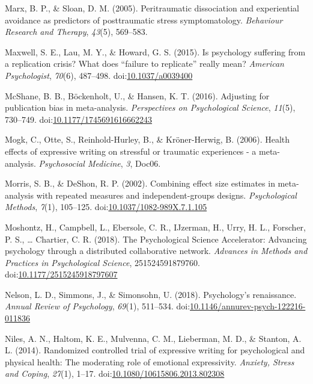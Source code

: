 \documentclass[man, mask]{apa6}
\theoremstyle{definition}
\theoremstyle{definition}
\theoremstyle{definition}
\theoremstyle{remark}
\begin{document}
\hypertarget{ref-Marx2005}{}
Marx, B. P., \& Sloan, D. M. (2005). Peritraumatic dissociation and
experiential avoidance as predictors of posttraumatic stress
symptomatology. \emph{Behaviour Research and Therapy}, \emph{43}(5),
569--583.

\hypertarget{ref-Maxwell2015}{}
Maxwell, S. E., Lau, M. Y., \& Howard, G. S. (2015). Is psychology
suffering from a replication crisis? What does ``failure to replicate''
really mean? \emph{American Psychologist}, \emph{70}(6), 487--498.
doi:\href{https://doi.org/10.1037/a0039400}{10.1037/a0039400}

\hypertarget{ref-McShane2016}{}
McShane, B. B., Böckenholt, U., \& Hansen, K. T. (2016). Adjusting for
publication bias in meta-analysis. \emph{Perspectives on Psychological
Science}, \emph{11}(5), 730--749.
doi:\href{https://doi.org/10.1177/1745691616662243}{10.1177/1745691616662243}

\hypertarget{ref-Mogk2006}{}
Mogk, C., Otte, S., Reinhold-Hurley, B., \& Kröner-Herwig, B. (2006).
Health effects of expressive writing on stressful or traumatic
experiences - a meta-analysis. \emph{Psychosocial Medicine}, \emph{3},
Doc06.

\hypertarget{ref-Morris2002}{}
Morris, S. B., \& DeShon, R. P. (2002). Combining effect size estimates
in meta-analysis with repeated measures and independent-groups designs.
\emph{Psychological Methods}, \emph{7}(1), 105--125.
doi:\href{https://doi.org/10.1037/1082-989X.7.1.105}{10.1037/1082-989X.7.1.105}

\hypertarget{ref-Moshontz2018}{}
Moshontz, H., Campbell, L., Ebersole, C. R., IJzerman, H., Urry, H. L.,
Forscher, P. S., \ldots{} Chartier, C. R. (2018). The Psychological
Science Accelerator: Advancing psychology through a distributed
collaborative network. \emph{Advances in Methods and Practices in
Psychological Science}, 251524591879760.
doi:\href{https://doi.org/10.1177/2515245918797607}{10.1177/2515245918797607}

\hypertarget{ref-Nelson2018}{}
Nelson, L. D., Simmons, J., \& Simonsohn, U. (2018). Psychology's
renaissance. \emph{Annual Review of Psychology}, \emph{69}(1), 511--534.
doi:\href{https://doi.org/10.1146/annurev-psych-122216-011836}{10.1146/annurev-psych-122216-011836}

\hypertarget{ref-Niles2014}{}
Niles, A. N., Haltom, K. E., Mulvenna, C. M., Lieberman, M. D., \&
Stanton, A. L. (2014). Randomized controlled trial of expressive writing
for psychological and physical health: The moderating role of emotional
expressivity. \emph{Anxiety, Stress and Coping}, \emph{27}(1), 1--17.
doi:\href{https://doi.org/10.1080/10615806.2013.802308}{10.1080/10615806.2013.802308}
\end{document}

